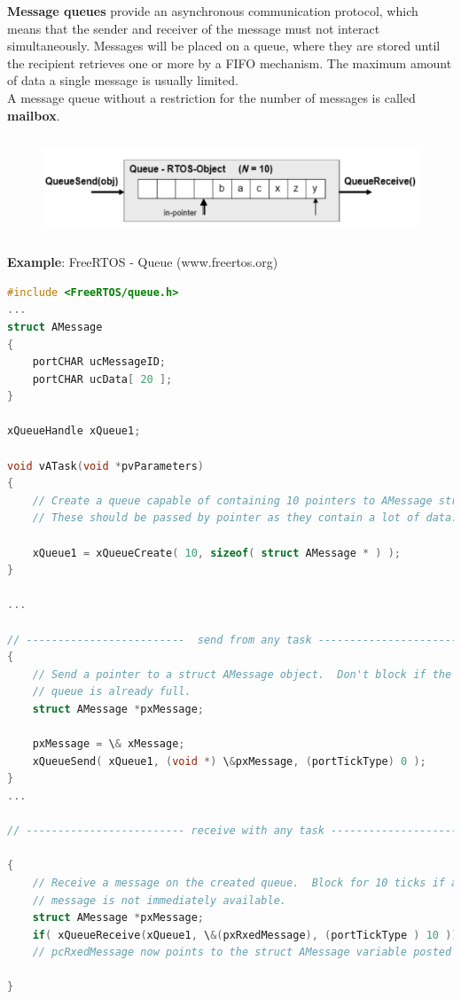 \textbf{Message queues} provide an asynchronous communication protocol, which means that the sender and receiver of the message must not interact simultaneously. Messages will be placed on a queue, where they are stored until the recipient retrieves one or more by a FIFO mechanism. The maximum amount of data a single message is usually limited.\\

A message queue without a restriction for the number of messages is called \textbf{mailbox}.

 	\begin{figure}[h]
    \centering
    \includegraphics[width=14cm, height=3cm]{Images/image115.png}
    \label{fig:Fig 62}
    \end{figure}
\newpage    
\textbf{Example}: FreeRTOS - Queue (www.freertos.org)

\begin{lstlisting}[style=mystyle, language=c]
#include <FreeRTOS/queue.h>
...
struct AMessage
{
	portCHAR ucMessageID;
	portCHAR ucData[ 20 ];
}

xQueueHandle xQueue1;

void vATask(void *pvParameters)
{
	// Create a queue capable of containing 10 pointers to AMessage structures.
	// These should be passed by pointer as they contain a lot of data.

	xQueue1 = xQueueCreate( 10, sizeof( struct AMessage * ) );
}

...

// -------------------------  send from any task ----------------------------}
{
 	// Send a pointer to a struct AMessage object.  Don't block if the
  	// queue is already full.
 	struct AMessage *pxMessage;

 	pxMessage = \& xMessage;
	xQueueSend( xQueue1, (void *) \&pxMessage, (portTickType) 0 );
}
...

// ------------------------- receive with any task --------------------------}

{  
	// Receive a message on the created queue.  Block for 10 ticks if a
	// message is not immediately available.
	struct AMessage *pxMessage;
	if( xQueueReceive(xQueue1, \&(pxRxedMessage), (portTickType ) 10 ))
	// pcRxedMessage now points to the struct AMessage variable posted

}
\end{lstlisting}

